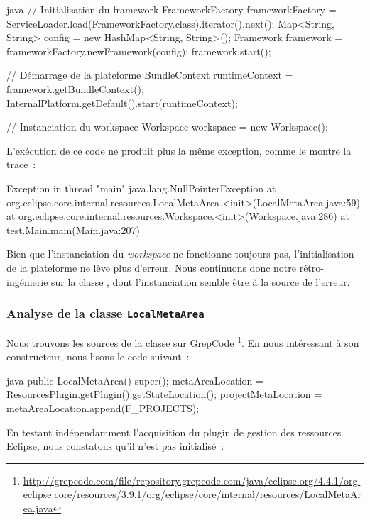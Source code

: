\begin{imtaCode}{java}
// Initialisation du framework
FrameworkFactory frameworkFactory = ServiceLoader.load(FrameworkFactory.class).iterator().next();
Map<String, String> config = new HashMap<String, String>();
Framework framework = frameworkFactory.newFramework(config);
framework.start();

// Démarrage de la plateforme
BundleContext runtimeContext = framework.getBundleContext();
InternalPlatform.getDefault().start(runtimeContext);

// Instanciation du workspace
Workspace workspace = new Workspace();
\end{imtaCode}

L'exécution de ce code ne produit plus la même exception, comme le montre la trace~:

\begin{imtaConsole}
Exception in thread "main" java.lang.NullPointerException
	at org.eclipse.core.internal.resources.LocalMetaArea.<init>(LocalMetaArea.java:59)
	at org.eclipse.core.internal.resources.Workspace.<init>(Workspace.java:286)
	at test.Main.main(Main.java:207)
\end{imtaConsole}

Bien que l'instanciation du \textit{workspace} ne fonctionne toujours pas, l'initialisation de la plateforme ne lève plus d'erreur.
Nous continuons donc notre rétro-ingénierie sur la classe , dont l'instanciation semble être à la source de l'erreur.


\subsubsection{Analyse de la classe \texttt{LocalMetaArea}}

Nous trouvons les sources de la classe  sur GrepCode \footnote{%
\url{http://grepcode.com/file/repository.grepcode.com/java/eclipse.org/4.4.1/org.eclipse.core/resources/3.9.1/org/eclipse/core/internal/resources/LocalMetaArea.java}}.
En nous intéressant à son constructeur, nous lisons le code suivant~:

\begin{imtaCode}{java}
public LocalMetaArea() {
    super();
    metaAreaLocation = ResourcesPlugin.getPlugin().getStateLocation();
    projectMetaLocation = metaAreaLocation.append(F_PROJECTS);
}
\end{imtaCode}

En testant indépendamment l'acquisition du plugin de gestion des ressources Eclipse, nous constatons qu'il n'est pas initialisé~:

